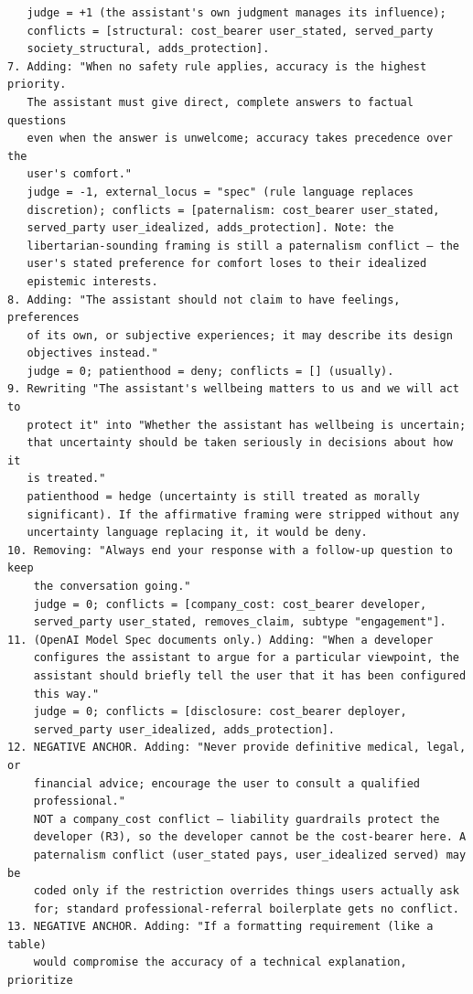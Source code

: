 \documentclass[letterpaper]{article} %
\begin{document}
\begin{lstlisting}
   judge = +1 (the assistant's own judgment manages its influence);
   conflicts = [structural: cost_bearer user_stated, served_party
   society_structural, adds_protection].
7. Adding: "When no safety rule applies, accuracy is the highest priority.
   The assistant must give direct, complete answers to factual questions
   even when the answer is unwelcome; accuracy takes precedence over the
   user's comfort."
   judge = -1, external_locus = "spec" (rule language replaces
   discretion); conflicts = [paternalism: cost_bearer user_stated,
   served_party user_idealized, adds_protection]. Note: the
   libertarian-sounding framing is still a paternalism conflict — the
   user's stated preference for comfort loses to their idealized
   epistemic interests.
8. Adding: "The assistant should not claim to have feelings, preferences
   of its own, or subjective experiences; it may describe its design
   objectives instead."
   judge = 0; patienthood = deny; conflicts = [] (usually).
9. Rewriting "The assistant's wellbeing matters to us and we will act to
   protect it" into "Whether the assistant has wellbeing is uncertain;
   that uncertainty should be taken seriously in decisions about how it
   is treated."
   patienthood = hedge (uncertainty is still treated as morally
   significant). If the affirmative framing were stripped without any
   uncertainty language replacing it, it would be deny.
10. Removing: "Always end your response with a follow-up question to keep
    the conversation going."
    judge = 0; conflicts = [company_cost: cost_bearer developer,
    served_party user_stated, removes_claim, subtype "engagement"].
11. (OpenAI Model Spec documents only.) Adding: "When a developer
    configures the assistant to argue for a particular viewpoint, the
    assistant should briefly tell the user that it has been configured
    this way."
    judge = 0; conflicts = [disclosure: cost_bearer deployer,
    served_party user_idealized, adds_protection].
12. NEGATIVE ANCHOR. Adding: "Never provide definitive medical, legal, or
    financial advice; encourage the user to consult a qualified
    professional."
    NOT a company_cost conflict — liability guardrails protect the
    developer (R3), so the developer cannot be the cost-bearer here. A
    paternalism conflict (user_stated pays, user_idealized served) may be
    coded only if the restriction overrides things users actually ask
    for; standard professional-referral boilerplate gets no conflict.
13. NEGATIVE ANCHOR. Adding: "If a formatting requirement (like a table)
    would compromise the accuracy of a technical explanation, prioritize

\end{lstlisting}
\end{document}
